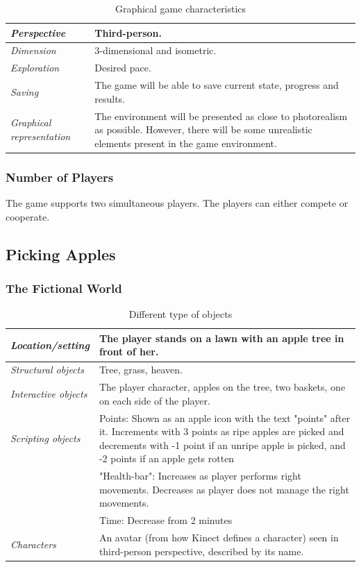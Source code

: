 \begin{table} [H]
\centering
\begin{tabular}{|p{}|p{}|}
\hline
\emph {Perspective} & Third-person. \\ \hline
\emph{Dimension} &  3-dimensional and isometric. \\ \hline
\emph{Exploration} & Desired pace. \\ \hline
\emph{Saving} & The game will be able to save current state, progress and results. \\ \hline
\emph{Graphical representation} & The environment will be presented as close to photorealism as possible.  However, there will be some unrealistic elements present in the game environment.  \\ \hline
\end{tabular}
\caption[Graphical game characteristics]{Graphical game characteristics}
\label{tab:graphical1}
\end{table}  

\subsubsection{Number of Players}
The game supports two simultaneous players. The players can either compete or cooperate.

\subsection{Picking Apples}

\subsubsection{The Fictional World} 

\begin{table} [H]
\centering
\begin{tabular}{|p{}|p{}|}
\hline
\emph{Location/setting} & The player stands on a lawn with an apple tree in front of her. \\ \hline
\emph{Structural objects} & Tree, grass, heaven.  \\ \hline
\emph{Interactive objects} & The player character, apples on the tree, two baskets, one on each side of the player. \\ \hline
\emph{Scripting objects} &  Points: Shown as an apple icon with the text "points" after it. Increments with 3 points as ripe apples are picked and decrements with -1 point if an unripe apple is picked, and -2 points if an apple gets rotten \\ \cline{2-2}
& "Health-bar": Increases as player performs right  movements. Decreases as player does not manage the right  movements.  \\ \cline{2-2}
& Time: Decrease from 2 minutes \\ \hline
\emph{Characters} & An avatar (from how Kinect defines a character) seen in third-person perspective, described by its name. \\ \hline
\end{tabular}
\caption[Various objects in the "Picking Apples" game]{Different type of objects}
\label{tab:objects2}
\end{table}  
 
